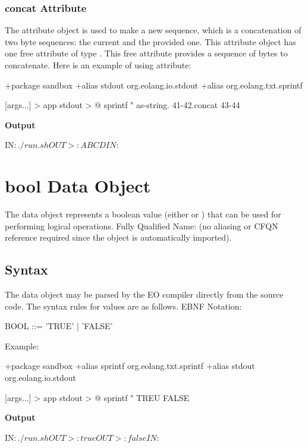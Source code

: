 \documentclass[12pt]{book}
\begin{document}
{\subsubsection{concat Attribute}
The  attribute object is used to make a new sequence, which is a concatenation of two byte sequences: the current and the provided one. This attribute object has one free attribute of type . This free attribute provides a sequence of bytes to concatenate. Here is an example of using  attribute:

\begin{ffcode}
+package sandbox
+alias stdout org.eolang.io.stdout
+alias org.eolang.txt.sprintf

[args...] > app
  stdout > @
    sprintf
      "%
      as-string.
        41-42.concat 43-44
\end{ffcode}
\textbf{Output}
\begin{ffcode}
IN$: ./run.sh
OUT>: ABCD
IN$: 
\end{ffcode}

\section{bool Data Object} \label{sec:bool-data-type}
The  data object represents a boolean value (either  or ) that can be used for performing logical operations.
Fully Qualified Name:  (no aliasing or CFQN reference required since the object is automatically imported).

\subsection{Syntax}
The  data object may be parsed by the EO compiler directly from the source code. The syntax rules for  values are as follows. EBNF Notation:
\begin{ffcode}
BOOL     ::= 'TRUE'
           | 'FALSE'
\end{ffcode}
Example:
\begin{ffcode}
+package sandbox
+alias sprintf org.eolang.txt.sprintf
+alias stdout org.eolang.io.stdout

[args...] > app
  stdout > @
    sprintf
      "%
      TREU
      FALSE
\end{ffcode}
\textbf{Output}
\begin{ffcode}
IN$: ./run.sh
OUT>: true
OUT>: false
IN$: 
\end{ffcode}

}
\end{document}
